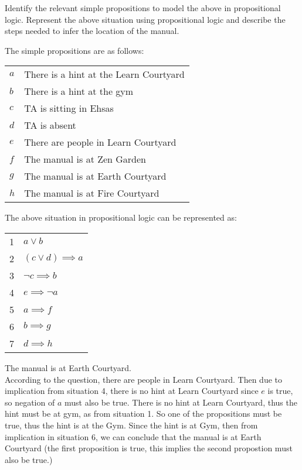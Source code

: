 \documentclass[addpoints]{exam}
\begin{document}
\begin{questions}
  Identify the relevant simple propositions to model the above in propositional logic. Represent the above situation using propositional logic and describe the steps needed to infer the location of the manual.
  \begin{solution}
    The simple propositions are as follows: \\
      \begin{tabularx}{\textwidth}{l@{ : }X}
        $a$ & There is a hint at the Learn Courtyard \\ 
        $b$ & There is a hint at the gym\\  
        $c$ & TA is sitting in Ehsas\\
        $d$ & TA is absent\\
        $e$ & There are people in Learn Courtyard\\
        $f$ & The manual is at Zen Garden\\
        $g$ & The manual is at Earth Courtyard\\
        $h$ & The manual is at Fire Courtyard
      \end{tabularx}
      The above situation in propositional logic can be represented as: \\
      \begin{tabularx}{\textwidth}{l@{ : }X}
        1 & $ a \lor b $ \\
        2 & $ (c \lor d) \implies a $ \\
        3 & $ \neg c \implies b $ \\
        4 & $ e \implies \neg a $ \\
        5 & $ a \implies f $ \\
        6 & $ b \implies g $ \\
        7 & $ d \implies h $ 
      \end{tabularx}
      The manual is at Earth Courtyard. \\
      According to the question, there are people in Learn Courtyard. 
      Then due to implication from situation 4, there is no hint at Learn Courtyard since $e$ is true, so negation of $a$ must also be true.
      There is no hint at Learn Courtyard, thus the hint must be at gym, as from situation 1. 
      So one of the propositions must be true, thus the hint is at the Gym. 
      Since the hint is at Gym, then from implication in situation 6, we can conclude that the manual is at Earth Courtyard 
      (the first proposition is true, this implies the second propostion must also be true.)


\end{solution}
\end{questions}
\end{document}
